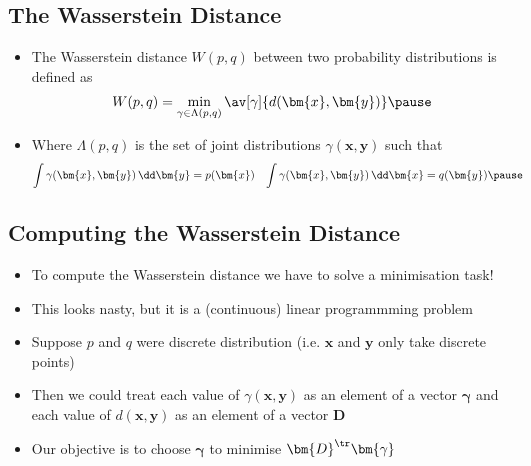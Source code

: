 
\begin{slide}
\section{The Wasserstein Distance}

\begin{PauseHighLight}
  \begin{itemize}
  \item The Wasserstein distance $W(p,q)$ between two probability
    distributions is defined as
    \begin{align*}
      W(p,q) = \min_{\gamma \in \Lambda(p,q)}
      \av[\gamma]{d(\bm{x},\bm{y})}\pause
    \end{align*}
  \item Where $\Lambda(p,q)$ is the set of joint distributions
    $\gamma(\bm{x},\bm{y})$ such that
    \begin{align*}
      \int \gamma(\bm{x},\bm{y}) \, \dd \bm{y} &= p(\bm{x}) &
      \int \gamma(\bm{x},\bm{y}) \, \dd \bm{x} &= q(\bm{y})\pause
    \end{align*}
  \end{itemize}
\end{PauseHighLight}

\end{slide}


\begin{slide}
\section[-1]{Computing the Wasserstein Distance}

\begin{PauseHighLight}
  \begin{itemize}
  \item To compute the Wasserstein distance we have to solve a
    minimisation task!\pause
  \item This looks nasty, but it is a (continuous) linear programmming
    problem\pause
  \item Suppose $p$ and $q$ were discrete distribution (i.e. $\bm{x}$
    and $\bm{y}$ only take discrete points)\pause
  \item Then we could treat each value of $\gamma(\bm{x},\bm{y})$ as
    an element of a vector $\bm{\gamma}$ and each value of
    $d(\bm{x},\bm{y})$ as an element of a vector $\bm{D}$\pause
  \item Our objective is to choose $\bm{\gamma}$ to minimise
    $\bm{D}^\tr\bm{\gamma}$\pause
  \end{itemize}
\end{PauseHighLight}

\end{slide}

